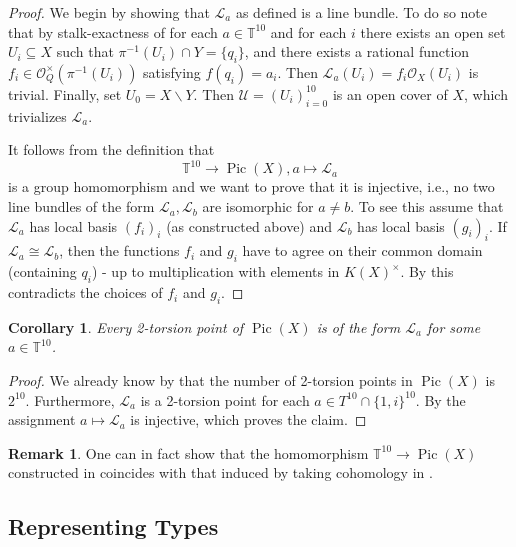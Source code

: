 \documentclass[a4paper,10pt]{amsart}
\theoremstyle{definition}
\newtheorem{rem}[Def]{Remark}
\theoremstyle{plain}
\newtheorem{cor}[Def]{Corollary}
\newcommand{\Pic}{\operatorname{Pic}}
\newcommand{\cL}{{\mathcal L}}
\newcommand{\cO}{{\mathcal O}}
\newcommand{\cU}{{\mathcal U}}
\begin{document}
\begin{proof}
 We begin by showing that $\cL_a$ as defined is a line bundle. To do so note that by stalk-exactness of  for each $a \in \mathbb{T}^{10}$ and for each $i$ there exists an open set $U_i \subseteq X$ such that $\pi^{-1}(U_i) \cap Y = \{q_i\}$, and there exists a rational function $f_i \in \cO_Q^\times(\pi^{-1}(U_i))$ satisfying $f(q_i) = a_i$. Then $\cL_a(U_i) = f_i\cO_X(U_i)$ is trivial. Finally, set $U_0 = X \backslash Y$. Then $\cU = (U_i)_{i=0}^{10}$ is an open cover of $X$, which trivializes $\cL_a$.

 It follows from the definition that
 \begin{equation*}
     \mathbb{T}^{10} \to \Pic(X), a \mapsto \cL_a
 \end{equation*}
 is a group homomorphism and we want to prove that it is injective, i.e., no two line bundles of the form $\cL_a, \cL_b$ are isomorphic for $a \neq b$. To see this assume that $\cL_a$ has local basis $(f_i)_i$ (as constructed above) and $\cL_b$ has local basis $(g_i)_i$. If $\cL_a \cong \cL_b$, then the functions $f_i$ and $g_i$ have to agree on their common domain (containing $q_i$) - up to multiplication with elements in $K(X)^\times$. By  this contradicts the choices of $f_i$ and $g_i$.
\end{proof}

\begin{cor}
 Every 2-torsion point of $\Pic(X)$ is of the form $\cL_a$ for some $a \in \mathbb{T}^ {10}$.
\end{cor}

\begin{proof}
 We already know by  that the number of 2-torsion points in $\Pic(X)$ is $2^{10}$. Furthermore, $\cL_a$ is a 2-torsion point for each $a \in T^{10} \cap \{1,i\}^{10}$. By  the assignment $a \mapsto \cL_a$ is injective, which proves the claim.
\end{proof}

\begin{rem}
 One can in fact show that the homomorphism $\mathbb{T}^{10} \to \Pic(X)$ constructed in  coincides with that induced by taking cohomology in .
\end{rem}



\subsection*{Representing Types}
\end{document}
